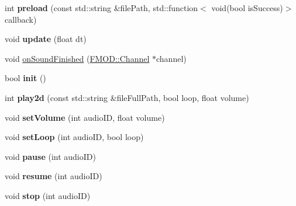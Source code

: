 \begin{DoxyCompactItemize}
int {\bfseries preload} (const std\+::string \&file\+Path, std\+::function$<$ void(bool is\+Success)$>$ callback)
\item 
\mbox{\label{classexperimental_1_1AudioEngineImpl_a0aa9187ac5e5341a505cf6154feceaee}} 
void {\bfseries update} (float dt)
\item 
void \hyperlink{classexperimental_1_1AudioEngineImpl_ab4e729728bd4265f0d17952661fd2ba4}{on\+Sound\+Finished} (\hyperlink{classFMOD_1_1Channel}{F\+M\+O\+D\+::\+Channel} $\ast$channel)
\item 
\mbox{\label{classexperimental_1_1AudioEngineImpl_a908e5136201a8a6b53ae5c292329f82b}} 
bool {\bfseries init} ()
\item 
\mbox{\label{classexperimental_1_1AudioEngineImpl_a04b788a8319f5d7f90e297a2a345f745}} 
int {\bfseries play2d} (const std\+::string \&file\+Full\+Path, bool loop, float volume)
\item 
\mbox{\label{classexperimental_1_1AudioEngineImpl_aaa11ae7fe8bfd4c4365c02aa71f119b0}} 
void {\bfseries set\+Volume} (int audio\+ID, float volume)
\item 
\mbox{\label{classexperimental_1_1AudioEngineImpl_afd6600a03fa747d44c79f09fbc41b373}} 
void {\bfseries set\+Loop} (int audio\+ID, bool loop)
\item 
\mbox{\label{classexperimental_1_1AudioEngineImpl_a9c4026caed1c625774d3fd1e2114322a}} 
void {\bfseries pause} (int audio\+ID)
\item 
\mbox{\label{classexperimental_1_1AudioEngineImpl_ad180e0563cfb6944074a19304152d990}} 
void {\bfseries resume} (int audio\+ID)
\item 
\mbox{\label{classexperimental_1_1AudioEngineImpl_a56856900e92d2a4c19ea1a629bf19393}} 
void {\bfseries stop} (int audio\+ID)
\item 
\mbox{\label{classexperimental_1_1AudioEngineImpl_abcf87e42d6015ae5a0760ce815fb6f28}} 

\end{DoxyCompactItemize}
